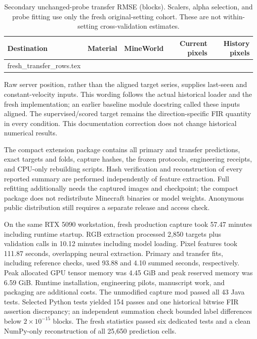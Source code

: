 \documentclass{article}
\makeatletter
\let\tablerows\@@input
\makeatother
\begin{document}
\begin{table}[!htbp]
\caption{Secondary unchanged-probe transfer RMSE (blocks). Scalers, alpha selection, and probe fitting use only the fresh original-setting cohort. These are not within-setting cross-validation estimates.}
\centering\small
\begin{tabular}{@{}llrrr@{}}
\toprule
Destination & Material & MineWorld & Current pixels & History pixels\\
\midrule
\tablerows fresh_transfer_rows.tex
\bottomrule
\end{tabular}
\end{table}

Raw server position, rather than the aligned target series, supplies last-seen and constant-velocity inputs. This wording follows the actual historical loader and the fresh implementation; an earlier baseline module docstring called these inputs aligned. The supervised/scored target remains the direction-specific FIR quantity in every condition. This documentation correction does not change historical numerical results.

The compact extension package contains all primary and transfer predictions, exact targets and folds, capture hashes, the frozen protocols, engineering receipts, and CPU-only rebuilding scripts. Hash verification and reconstruction of every reported summary are performed independently of feature extraction. Full refitting additionally needs the captured images and checkpoint; the compact package does not redistribute Minecraft binaries or model weights. Anonymous public distribution still requires a separate release and access check.

On the same RTX 5090 workstation, fresh production capture took 57.47 minutes including runtime startup. RGB extraction processed 2,850 targets plus validation calls in 10.12 minutes including model loading. Pixel features took 111.87 seconds, overlapping neural extraction. Primary and transfer fits, including reference checks, used 93.88 and 4.10 summed seconds, respectively. Peak allocated GPU tensor memory was 4.45 GiB and peak reserved memory was 6.59 GiB. Runtime installation, engineering pilots, manuscript work, and packaging are additional costs. The unmodified capture mod passed all 43 Java tests. Selected Python tests yielded 154 passes and one historical bitwise FIR assertion discrepancy; an independent summation check bounded label differences below $2\times10^{-15}$ blocks. The fresh statistics passed six dedicated tests and a clean NumPy-only reconstruction of all 25,650 prediction cells.
\end{document}
